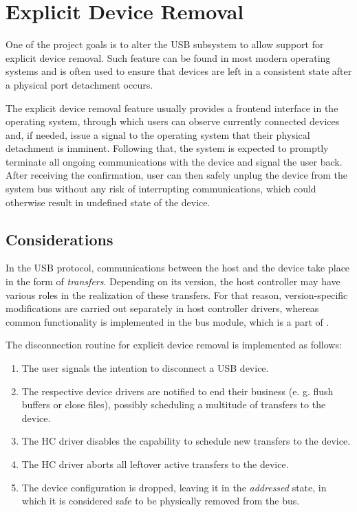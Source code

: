 \section{Explicit Device Removal}

One of the project goals is to alter the USB subsystem to allow support for
explicit device removal. Such feature can be found in most modern operating
systems and is often used to ensure that devices are left in a consistent state
after a physical port detachment occurs.

The explicit device removal feature usually provides a frontend interface in
the operating system, through which users can observe currently connected
devices and, if needed, issue a signal to the operating system that their
physical detachment is imminent. Following that, the system is expected to
promptly terminate all ongoing communications with the device and signal the
user back. After receiving the confirmation, user can then safely unplug the
device from the system bus without any risk of interrupting communications,
which could otherwise result in undefined state of the device.


\subsection{Considerations}

In the USB protocol, communications between the host and the device take place
in the form of \textit{transfers}. Depending on its version, the host controller
may have various roles in the realization of these transfers. For that reason,
version-specific modifications are carried out separately in host controller
drivers, whereas common functionality is implemented in the bus module, which is
a part of .

The disconnection routine for explicit device removal is implemented as follows:
~
\begin{enumerate}
	\item The user signals the intention to disconnect a USB device.
	\item The respective device drivers are notified to end their business (e.
		g. flush buffers or close files), possibly scheduling a multitude of
		transfers to the device.
	\item The HC driver disables the capability to schedule new transfers to the
		device.
	\item The HC driver aborts all leftover active transfers to the device.
	\item The device configuration is dropped, leaving it in the
		\textit{addressed} state, in which it is considered safe to be
		physically removed from the bus.
\end{enumerate}

